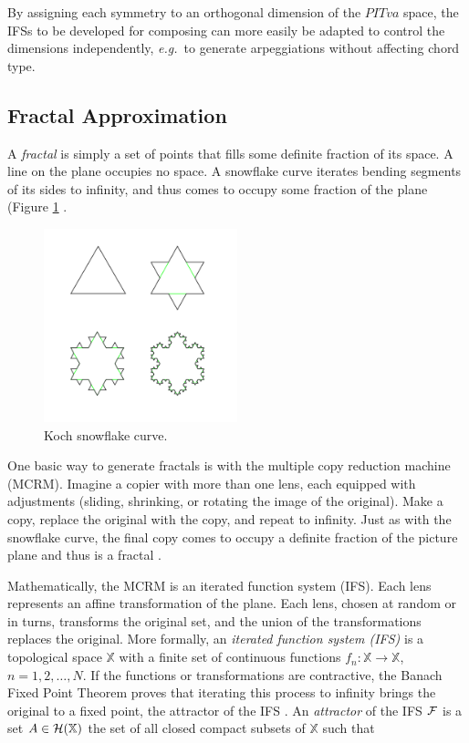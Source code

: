 \documentclass[english,11pt,letterpaper,onecolumn]{scrartcl}
\numberwithin{equation}{section}
\newcommand{\X}{\mathbb{X}}
\begin{document}
\noindent By assigning each symmetry to an orthogonal dimension of the $PITva$ 
space, the IFSs to be developed for composing can more easily be adapted to 
control the dimensions independently, \textit{e.g.}\ to generate  arpeggiations 
without affecting chord type.

\subsection{Fractal Approximation}

A \textit{fractal} is simply a set of points that fills some definite fraction 
of its space. A line on the plane occupies no space. A snowflake curve iterates 
bending segments of its sides to infinity, and thus comes to occupy some 
fraction of the plane (Figure \ref{fig:kochflake} \cite{Mandelbrot:1982:FGN}.

    \begin{figure}
        \centerline{\includegraphics[width = 0.5\textwidth]{KochFlake}}
        \caption{\label{fig:kochflake} Koch snowflake 
curve.\protect\footnotemark}
    \end{figure}


One basic way to generate fractals is with the multiple copy reduction 
machine (MCRM). Imagine a copier with more than one lens, each equipped with 
adjustments (sliding, shrinking, or rotating the image of the original). Make 
a copy, replace the original with the copy, and repeat to infinity. Just as 
with the snowflake curve, the final copy comes to occupy a definite fraction 
of the picture plane and thus is a fractal \cite{chaosandfractals}. 

Mathematically, the MCRM is an iterated function system (IFS). Each lens 
represents an affine transformation of the plane. Each lens, chosen at random 
or in turns, transforms the original set, and the union of the transformations  
replaces the original. More formally, an \emph{iterated function system (IFS)} 
is a topological space $\mathbb{X}$ with a finite set of continuous functions 
$f_{n}:\X\rightarrow \X$, 
$n=1,2,\dots,N$. If the functions or transformations are contractive, the 
Banach Fixed Point Theorem proves that iterating this process to infinity 
brings the original to a fixed point, the attractor of the IFS 
\cite{chaosandfractals, barnsley1985iterated, 10.2307/24893080, 
fractalseverywhere}. An \emph{attractor} of the IFS $\cal{F}$ is a set
$A\in \cal{H}(\X)$ the set of all closed compact subsets of $\X$ such that
\end{document}
